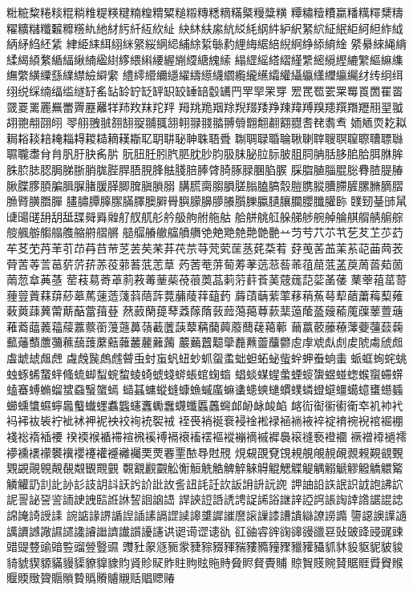 䊋䊌䊍䊎䊏䊐䊑䊒䊓䊔䊕䊖䊗䊘䊙䊚䊛䊜䊝䊞䊟䊠䊡䊢䊣
䊤䊥䊦䊧䊨䊩䊪䊫䊬䊭䊮䊯䊰䊱䊲䊳䊴䊵䊶䊷䊸䊹䊺䊻䊼
䊽䊾䊿䋀䋁䋂䋃䋄䋅䋆䋇䋈䋉䋊䋋䋌䋍䋎䋏䋐䋑䋒䋓䋔䋕
䋖䋗䋘䋙䋚䋛䋜䋝䋞䋟䋠䋡䋢䋣䋤䋥䋦䋧䋨䋩䋪䋫䋬䋭䋮
䋯䋰䋱䋲䋳䋴䋵䋶䋷䋸䋹䋺䋻䋼䋽䋾䋿䌀䌁䌂䌃䌄䌅䌆䌇
䌈䌉䌊䌋䌌䌍䌎䌏䌐䌑䌒䌓䌔䌕䌖䌗䌘䌙䌚䌛䌜䌝䌞䌟䌠
䌡䌢䌣䌤䌥䌦䌧䌨䌩䌪䌫䌬䌭䌮䌯䌰䌱䌲䌳䌴䌵䌶䌸䌹䌺
䌻䌼䌽䌾䌿䍀䍁䍂䍃䍄䍅䍆䍇䍈䍉䍊䍋䍌䍍䍎䍏䍐䍑䍒䍓
䍔䍕䍖䍗䍘䍙䍚䍛䍜䍝䍞䍟䍠䍡䍢䍣䍤䍥䍦䍧䍨䍩䍪䍫䍬
䍭䍮䍯䍰䍱䍲䍳䍴䍵䍶䍷䍸䍹䍺䍻䍼䍽䍾䍿䎀䎁䎂䎃䎄䎅
䎆䎇䎈䎉䎊䎋䎌䎍䎎䎏䎐䎑䎒䎓䎔䎕䎖䎗䎘䎙䎚䎛䎜䎝䎞
䎟䎠䎡䎢䎣䎤䎥䎦䎧䎨䎩䎪䎫䎭䎮䎯䎰䎲䎳䎴䎵䎶䎷䎸䎹
䎺䎻䎼䎽䎾䎿䏀䏁䏂䏃䏄䏅䏆䏇䏈䏉䏊䏋䏌䏍䏎䏏䏐䏑䏒
䏓䏔䏕䏖䏗䏘䏙䏚䏛䏜䏞䏟䏠䏡䏢䏣䏤䏥䏦䏧䏨䏩䏪䏫䏬
䏭䏮䏯䏰䏱䏲䏳䏴䏵䏶䏷䏸䏹䏺䏻䏼䏽䏾䏿䐀䐁䐂䐃䐄䐅
䐆䐇䐈䐉䐊䐋䐌䐍䐎䐏䐐䐑䐒䐓䐔䐕䐖䐗䐘䐙䐚䐛䐜䐝䐞
䐟䐠䐡䐢䐣䐤䐥䐦䐧䐨䐩䐪䐫䐬䐭䐮䐯䐰䐱䐲䐳䐴䐵䐶䐷
䐸䐹䐺䐻䐼䐽䐾䐿䑀䑁䑂䑃䑄䑅䑆䑇䑈䑉䑊䑋䑌䑍䑎䑏䑐
䑑䑒䑓䑔䑕䑖䑗䑘䑙䑚䑛䑜䑝䑞䑟䑠䑡䑢䑣䑤䑥䑦䑧䑨䑩
䑪䑫䑬䑭䑮䑯䑰䑱䑲䑳䑴䑵䑶䑷䑸䑹䑺䑻䑼䑽䑾䑿䒀䒁䒂
䒃䒄䒅䒆䒇䒈䒉䒊䒋䒌䒍䒎䒏䒐䒑䒒䒓䒔䒕䒖䒗䒘䒙䒚䒛
䒜䒝䒞䒟䒠䒡䒢䒣䒤䒥䒦䒧䒨䒩䒪䒫䒬䒭䒮䒯䒰䒱䒲䒳䒴
䒵䒶䒷䒸䒹䒺䒻䒼䒽䒾䒿䓀䓁䓂䓃䓄䓅䓆䓇䓈䓉䓊䓋䓌䓍
䓎䓏䓐䓑䓒䓓䓔䓕䓗䓘䓙䓚䓛䓜䓝䓞䓟䓠䓡䓢䓣䓤䓥䓦䓧
䓨䓩䓪䓫䓬䓭䓮䓯䓰䓱䓲䓳䓴䓵䓶䓷䓸䓹䓺䓻䓼䓽䓾䓿䔀
䔁䔂䔃䔄䔅䔆䔇䔈䔉䔊䔋䔌䔍䔎䔏䔐䔑䔒䔓䔔䔕䔖䔗䔘䔙
䔚䔛䔜䔝䔞䔟䔠䔡䔢䔣䔤䔥䔦䔧䔨䔩䔪䔫䔬䔭䔮䔯䔰䔱䔲
䔳䔴䔵䔶䔷䔸䔹䔺䔻䔼䔽䔾䔿䕀䕁䕂䕃䕄䕅䕆䕇䕈䕉䕊䕋
䕌䕍䕎䕏䕐䕑䕒䕓䕔䕕䕖䕗䕘䕙䕚䕛䕜䕝䕞䕟䕠䕡䕢䕣䕤
䕥䕦䕧䕨䕩䕪䕫䕬䕭䕮䕯䕰䕱䕲䕳䕴䕵䕶䕷䕸䕹䕺䕻䕼䕽
䕾䕿䖀䖁䖂䖃䖄䖅䖆䖇䖈䖉䖊䖋䖌䖍䖎䖏䖐䖑䖒䖓䖔䖕䖖
䖗䖘䖙䖚䖛䖜䖝䖞䖟䖠䖡䖢䖣䖤䖥䖦䖧䖨䖩䖪䖫䖬䖭䖮䖯
䖰䖱䖲䖳䖴䖵䖶䖷䖸䖹䖺䖻䖼䖽䖾䖿䗀䗁䗂䗃䗄䗅䗆䗇䗈
䗉䗊䗋䗌䗍䗎䗏䗐䗑䗒䗓䗔䗕䗖䗗䗘䗙䗚䗛䗜䗝䗞䗟䗠䗡
䗢䗣䗤䗥䗦䗧䗨䗩䗪䗫䗬䗭䗮䗯䗰䗱䗲䗳䗴䗵䗶䗷䗸䗹䗺
䗻䗼䗽䗾䗿䘀䘁䘂䘃䘄䘅䘆䘇䘈䘉䘊䘋䘌䘍䘎䘏䘐䘑䘒䘓
䘔䘕䘖䘗䘘䘙䘚䘛䘜䘝䘞䘟䘠䘡䘢䘣䘤䘥䘦䘧䘨䘩䘪䘫䘬
䘭䘮䘯䘰䘱䘲䘳䘴䘵䘶䘷䘸䘹䘺䘻䘼䘽䘾䘿䙀䙁䙂䙃䙄䙅
䙆䙇䙈䙉䙊䙋䙍䙎䙏䙐䙑䙒䙓䙔䙕䙖䙗䙘䙙䙚䙛䙜䙝䙞䙟
䙠䙢䙣䙤䙥䙦䙧䙨䙩䙪䙫䙬䙭䙮䙯䙰䙱䙲䙳䙴䙵䙶䙷䙸䙹
䙺䙻䙼䙽䙾䙿䚀䚁䚂䚃䚄䚅䚆䚇䚈䚉䚊䚋䚌䚍䚎䚏䚐䚑䚒
䚓䚔䚕䚖䚗䚘䚙䚚䚛䚜䚝䚞䚟䚠䚡䚢䚣䚤䚥䚦䚧䚨䚩䚪䚫
䚬䚭䚮䚯䚰䚱䚲䚳䚴䚵䚶䚷䚸䚹䚺䚻䚼䚽䚾䚿䛀䛁䛂䛃䛄
䛅䛆䛇䛈䛉䛊䛋䛌䛍䛎䛏䛐䛑䛒䛓䛔䛕䛖䛗䛘䛙䛚䛛䛜䛝
䛞䛟䛠䛡䛢䛣䛤䛥䛦䛧䛨䛩䛪䛫䛬䛭䛮䛯䛰䛱䛲䛳䛴䛵䛶
䛷䛸䛹䛺䛻䛼䛽䛾䛿䜀䜁䜂䜃䜄䜅䜆䜇䜈䜉䜊䜋䜌䜍䜎䜏
䜐䜑䜒䜓䜔䜕䜖䜗䜘䜙䜚䜛䜜䜝䜞䜟䜠䜡䜢䜤䜥䜦䜧䜨䜪
䜫䜬䜭䜮䜯䜰䜱䜲䜳䜴䜵䜶䜷䜸䜹䜺䜻䜼䜽䜾䜿䝀䝁䝂䝃
䝄䝅䝆䝇䝈䝉䝊䝋䝌䝍䝎䝏䝐䝑䝒䝓䝔䝕䝖䝗䝘䝙䝚䝛䝜
䝝䝞䝟䝠䝡䝢䝣䝤䝥䝦䝧䝨䝩䝪䝫䝬䝭䝮䝯䝰䝱䝲䝳䝴䝵
䝶䝷䝸䝹䝺䝻䝽䝾䝿䞀䞁䞂䞃䞄䞅䞆䞇䞈䞉䞊䞋䞌䞎䞏䞐

